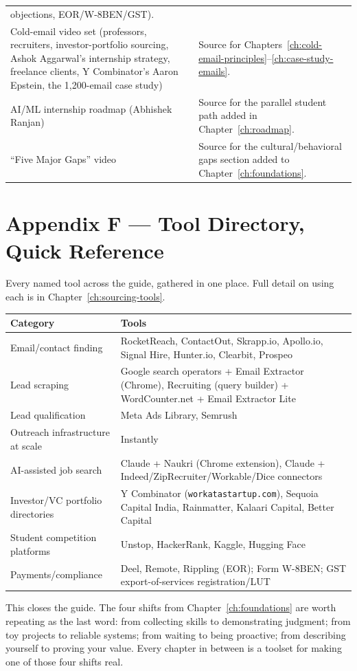 \begin{longtable}{p{} p{}}
objections, EOR/W-8BEN/GST). \\
Cold-email video set (professors, recruiters, investor-portfolio sourcing, Ashok Aggarwal's internship strategy,
freelance clients, Y Combinator's Aaron Epstein, the 1,200-email case study) & Source for
Chapters~\ref{ch:cold-email-principles}--\ref{ch:case-study-emails}. \\
AI/ML internship roadmap (Abhishek Ranjan) & Source for the parallel student path added in
Chapter~\ref{ch:roadmap}. \\
``Five Major Gaps'' video & Source for the cultural/behavioral gaps section added to Chapter~\ref{ch:foundations}.
\\
\bottomrule
\end{longtable}

\section{Appendix F --- Tool Directory, Quick Reference}
\label{app:tools}

Every named tool across the guide, gathered in one place. Full detail on using each is in
Chapter~\ref{ch:sourcing-tools}.

\begin{longtable}{p{} p{}}
\toprule
\textbf{Category} & \textbf{Tools} \\
\midrule
\endhead
Email/contact finding & RocketReach, ContactOut, Skrapp.io, Apollo.io, Signal Hire, Hunter.io, Clearbit, Prospeo
\\
Lead scraping & Google search operators + Email Extractor (Chrome), Recruiting (query builder) + WordCounter.net
+ Email Extractor Lite \\
Lead qualification & Meta Ads Library, Semrush \\
Outreach infrastructure at scale & Instantly \\
AI-assisted job search & Claude + Naukri (Chrome extension), Claude + Indeed/ZipRecruiter/Workable/Dice
connectors \\
Investor/VC portfolio directories & Y Combinator (\texttt{workatastartup.com}), Sequoia Capital India, Rainmatter,
Kalaari Capital, Better Capital \\
Student competition platforms & Unstop, HackerRank, Kaggle, Hugging Face \\
Payments/compliance & Deel, Remote, Rippling (EOR); Form W-8BEN; GST export-of-services registration/LUT \\
\bottomrule
\end{longtable}

\begin{keytakeaway}
This closes the guide. The four shifts from Chapter~\ref{ch:foundations} are worth repeating as the last word:
from collecting skills to demonstrating judgment; from toy projects to reliable systems; from waiting to being
proactive; from describing yourself to proving your value. Every chapter in between is a toolset for making one
of those four shifts real.
\end{keytakeaway}

